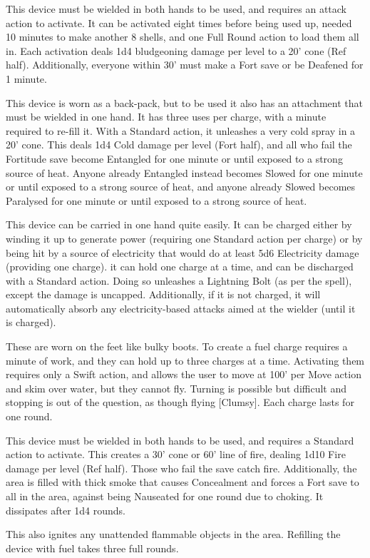 {This device must be wielded in both hands to be used, and requires an attack action to activate. It can be activated eight times before being used up, needed 10 minutes to make another 8 shells, and one Full Round action to load them all in. Each activation deals 1d4 bludgeoning damage per level to a 20' cone (Ref half). Additionally, everyone within 30' must make a Fort save or be Deafened for 1 minute.}

{This device is worn as a back-pack, but to be used it also has an attachment that must be wielded in one hand. It has three uses per charge, with a minute required to re-fill it. With a Standard action, it unleashes a very cold spray in a 20' cone. This deals 1d4 Cold damage per level (Fort half), and all who fail the Fortitude save become Entangled for one minute or until exposed to a strong source of heat. Anyone already Entangled instead becomes Slowed for one minute or until exposed to a strong source of heat, and anyone already Slowed becomes Paralysed for one minute or until exposed to a strong source of heat.}

{This device can be carried in one hand quite easily. It can be charged either by winding it up to generate power (requiring one Standard action per charge) or by being hit by a source of electricity that would do at least 5d6 Electricity damage (providing one charge). it can hold one charge at a time, and can be discharged with a Standard action. Doing so unleashes a Lightning Bolt (as per the spell), except the damage is uncapped. Additionally, if it is not charged, it will automatically absorb any electricity-based attacks aimed at the wielder (until it is charged).}

{These are worn on the feet like bulky boots. To create a fuel charge requires a minute of work, and they can hold up to three charges at a time. Activating them requires only a Swift action, and allows the user to move at 100' per Move action and skim over water, but they cannot fly. Turning is possible but difficult and stopping is out of the question, as though flying [Clumsy]. Each charge lasts for one round.}

{This device must be wielded in both hands to be used, and requires a Standard action to activate. This creates a 30' cone or 60' line of fire, dealing 1d10 Fire damage per level (Ref half). Those who fail the save catch fire. Additionally, the area is filled with thick smoke that causes Concealment and forces a Fort save to all in the area, against being Nauseated for one round due to choking. It dissipates after 1d4 rounds.\medskip

\noindent This also ignites any unattended flammable objects in the area. Refilling the device with fuel takes three full rounds.}


